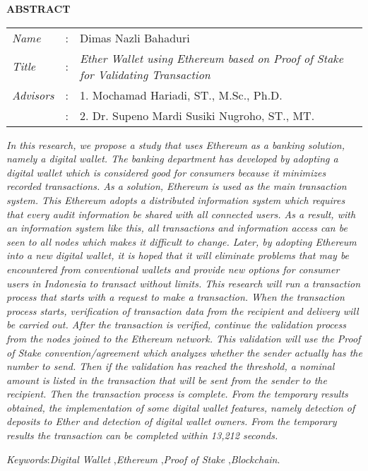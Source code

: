 \begin{center}
  \large\textbf{ABSTRACT}
\end{center}


\vspace{2ex}

\begingroup
  \setlength{\tabcolsep}{0pt}

  \noindent
  \begin{tabularx}{\textwidth}{l >{\centering}m{3em} X}
    \emph{Name}     &:& Dimas Nazli Bahaduri \\

    \emph{Title}    &:& \emph{Ether Wallet using Ethereum based on Proof of Stake for Validating Transaction} \\

    \emph{Advisors} &:& 1. Mochamad Hariadi, ST., M.Sc., Ph.D. \\
  &:& 2. Dr. Supeno Mardi Susiki Nugroho, ST., MT.
  \end{tabularx}
\endgroup

\emph{In this research, we propose a study that uses Ethereum as a banking solution, namely a digital wallet. The banking department has developed by adopting a digital wallet which is considered good for consumers because it minimizes recorded transactions. As a solution, Ethereum is used as the main transaction system. This Ethereum adopts a distributed information system which requires that every audit information be shared with all connected users. As a result, with an information system like this, all transactions and information access can be seen to all nodes which makes it difficult to change. Later, by adopting Ethereum into a new digital wallet, it is hoped that it will eliminate problems that may be encountered from conventional wallets and provide new options for consumer users in Indonesia to transact without limits. This research will run a transaction process that starts with a request to make a transaction. When the transaction process starts, verification of transaction data from the recipient and delivery will be carried out. After the transaction is verified, continue the validation process from the nodes joined to the Ethereum network. This validation will use the Proof of Stake convention/agreement which analyzes whether the sender actually has the number to send. Then if the validation has reached the threshold, a nominal amount is listed in the transaction that will be sent from the sender to the recipient. Then the transaction process is complete. From the temporary results obtained, the implementation of some digital wallet features, namely detection of deposits to Ether and detection of digital wallet owners. From the temporary results the transaction can be completed within 13,212 seconds.}

\emph{Keywords}:\emph{Digital Wallet} ,\emph{Ethereum} ,\emph{Proof of Stake}  ,\emph{Blockchain}.
